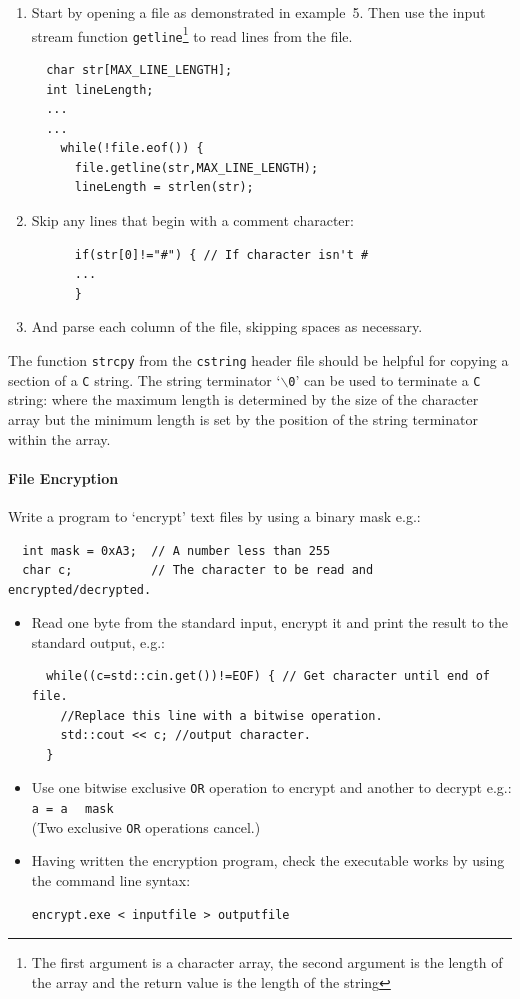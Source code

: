 \documentclass[11pt,a4paper]{scrartcl}
\begin{document}
\begin{enumerate}
\item Start by opening a file as demonstrated in example~5.
Then use the input stream function \texttt{getline}\footnote{The first
argument is a character array, the second argument is the length of
the array and the return value is the length of the string} to read
lines from the file.
\begin{verbatim}
  char str[MAX_LINE_LENGTH];
  int lineLength;
  ...
  ...
    while(!file.eof()) {
      file.getline(str,MAX_LINE_LENGTH);
      lineLength = strlen(str);
\end{verbatim}
\item Skip any lines that begin with a comment character:
\begin{verbatim}
      if(str[0]!="#") { // If character isn't # 
      ...
      }
\end{verbatim}
\item And parse each column of the file, skipping spaces as necessary.
\end{enumerate}

\noindent The function \texttt{strcpy} from the \texttt{cstring}
header file should be helpful for copying a section of a \texttt{C}
string.  The 
string terminator `\texttt{$\backslash$0}' can be used to terminate a
\texttt{C} string: where the maximum length is determined by the size
of the character array but the minimum length is set by the position
of the string terminator within the array.

\paragraph{File Encryption} 
Write a program to `encrypt' text files by using a binary mask e.g.:
\begin{verbatim}
  int mask = 0xA3;  // A number less than 255
  char c;           // The character to be read and encrypted/decrypted.
\end{verbatim}

\begin{itemize}
\item Read one byte from the standard input, encrypt
it and print the result to the standard output, e.g.:
\begin{verbatim}
  while((c=std::cin.get())!=EOF) { // Get character until end of file.
    //Replace this line with a bitwise operation.
    std::cout << c; //output character.
  }  
\end{verbatim}

\item Use one bitwise exclusive \texttt{OR} operation to encrypt and another to
decrypt e.g.:\\ 
\texttt{a = a \^{$\:$} mask}\\
(Two exclusive \texttt{OR} operations cancel.) 

\item Having written the encryption program, check the executable works by
using the command line syntax:
\begin{verbatim}
encrypt.exe < inputfile > outputfile
\end{verbatim}
\end{itemize}
\end{document}
